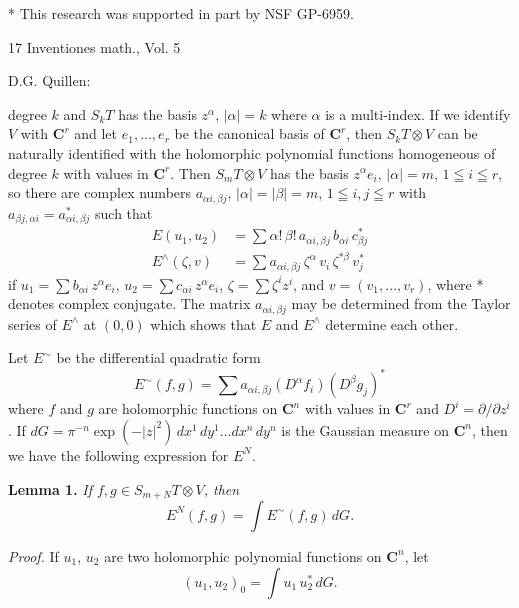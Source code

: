 * This research was supported in part by NSF GP-6959.

17 Inventiones math., Vol. 5


 \hfill D.G. Quillen:

degree $k$ and $S_k T$ has the basis $z^\alpha$, $|\alpha|=k$ where $\alpha$ is a multi-index. If we
identify $V$ with $\mathbf{C}^r$ and let $e_1,\dots,e_r$ be the canonical basis of $\mathbf{C}^r$, then
$S_k T\otimes V$ can be naturally identified with the holomorphic polynomial
functions homogeneous of degree $k$ with values in $\mathbf{C}^r$. Then $S_m T\otimes V$
has the basis $z^\alpha e_i$, $|\alpha|=m$, $1\leqq i\leqq r$, so there are complex numbers $a_{\alpha i,\beta j}$,
$|\alpha|=|\beta|=m$, $1\leqq i, j\leqq r$ with $a_{\beta j,\alpha i}=a^*_{\alpha i,\beta j}$ such that
\[
\begin{aligned}
E(u_1,u_2)&=\sum \alpha!\,\beta!\,a_{\alpha i,\beta j}\,b_{\alpha i}\,c^*_{\beta j}\\
E^\wedge(\zeta,v)&=\sum a_{\alpha i,\beta j}\,\zeta^\alpha\,v_i\,\zeta^{*\beta}\,v^*_j
\end{aligned}
\tag{2}
\]
if $u_1=\sum b_{\alpha i}\,z^\alpha e_i$, $u_2=\sum c_{\alpha i}\,z^\alpha e_i$, $\zeta=\sum \zeta^i z^i$, and $v=(v_1,\dots,v_r)$, where *
denotes complex conjugate. The matrix $a_{\alpha i,\beta j}$ may be determined from
the Taylor series of $E^\wedge$ at $(0,0)$ which shows that $E$ and $E^\wedge$ determine
each other.

Let $E^\sim$ be the differential quadratic form
\[
E^\sim(f,g)=\sum a_{\alpha i,\beta j}(D^\alpha f_i)(D^\beta g_j)^*
\]
where $f$ and $g$ are holomorphic functions on $\mathbf{C}^n$ with values in $\mathbf{C}^r$ and
$D^i=\partial/\partial z^i$. If $dG=\pi^{-n}\exp(-|z|^2)\,dx^1\,dy^1\dots dx^n\,dy^n$ is the Gaussian
measure on $\mathbf{C}^n$, then we have the following expression for $E^N$.

\textbf{Lemma 1.} \textit{If $f,g\in S_{m+N}T\otimes V$, then}
\[
E^N(f,g)=\int E^\sim(f,g)\,dG.
\]

\textit{Proof.} If $u_1$, $u_2$ are two holomorphic polynomial functions on $\mathbf{C}^n$, let
\[
(u_1,u_2)_0=\int u_1\,u_2^*\,dG.
\]


